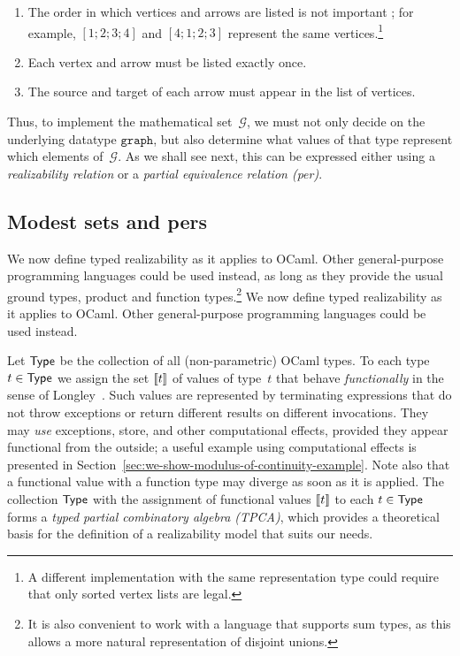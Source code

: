 %
\begin{enumerate}
\item The order in which vertices and arrows are listed is not
  important%
\iflong
; for example, $[1;2;3;4]$ and $[4;1;2;3]$ represent the same vertices.\footnote{
  A different implementation with the same representation type could require
  that only sorted vertex lists are legal.}
\fi %
\item Each vertex and arrow must be listed exactly once.
\item The source and target of each arrow must appear in the list of vertices.
\end{enumerate}
%
Thus, to implement the mathematical set~$\mathcal{G}$, we must not
only decide on the underlying datatype $\mathtt{graph}$, but also
determine what values of that type represent which elements
of~$\mathcal{G}$. As we shall see next, this can be expressed either
using a \emph{realizability relation} or a \emph{partial equivalence
  relation (per)}.


\subsection{Modest sets and pers}
\label{sec:modest-sets-pers}

\iflong
We now define typed realizability as it
applies to OCaml. Other general-purpose programming languages could be
used instead, as long as they provide the usual ground types, product
and function types.\footnote{It is also convenient to work with a
language that supports sum types, as this allows a more natural
representation of disjoint unions.}
\else
We now define typed realizability as it
applies to OCaml. Other general-purpose programming languages could be
used instead.
\fi %

\goodbreak

Let $\mathsf{Type}$ be the collection of all (non-parametric) OCaml types. To
each type $t \in \mathsf{Type}$ we assign the set $[\![t]\!]$ of values of
type~$t$ that behave \emph{functionally} in the sense
of Longley~\cite{longley99when}. Such values are represented by terminating
expressions that do not throw exceptions or return different results
on different invocations.  They may \emph{use} exceptions,
store, and other computational effects, provided they appear
functional from the outside; a useful example using computational effects is
presented in Section~\ref{sec:we-show-modulus-of-continuity-example}.
Note also that a functional value with a function type may diverge as
soon as it is applied.   The collection $\mathsf{Type}$ with the assignment of functional
values $[\![t]\!]$ to each $t \in \mathsf{Type}$ forms a \emph{typed partial
  combinatory algebra (TPCA)}, which provides a theoretical basis for
the definition of a realizability model that suits our needs.

